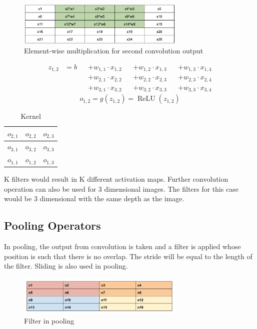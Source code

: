 \documentclass[11pt, twosides]{article}
\begin{document}
\begin{figure}[htp]
    \centering
    \includegraphics[width=8cm]{second.png}
    \caption{Element-wise multiplication for second convolution output}
    \label{fig:galaxy}
\end{figure}
\begin{align*}
    z_{1,2} &= b &&+ w_{1,1} \cdot x_{1,2} && + w_{1,2} \cdot x_{1,3} && + w_{1,3} \cdot x_{1,4} \\
            &    &&+ w_{2,1} \cdot x_{2,2} && + w_{2,2} \cdot x_{2,3} && + w_{2,3} \cdot x_{2,4} \\
            &    &&+ w_{3,1} \cdot x_{3,2} && + w_{3,2} \cdot x_{3,3} && + w_{3,3} \cdot x_{3,4}
\end{align*}
\begin{equation*}
    o_{1,2} = g(z_{1,2}) = \operatorname{ReLU}(z_{1,2})
\end{equation*}

\begin{table}[H]
  \centering
  \begin{tabular}
    { | c | c | c | } 
    \hline $o_{2,1}$ & $o_{2,2}$ & $o_{2,3}$ \\
    \hline $o_{3,1}$ & $o_{3,2}$ & $o_{3,3}$ \\
    \hline $o_{1,1}$ & $o_{1,2}$ & $o_{1,3}$ \\
    \hline
  \end{tabular}
  \caption{Kernel}
  \label{fig:my_label}
\end{table}

K filters would result in K different activation maps. Further convolution operation can also be used for 3 dimensional images. The filters for this case would be 3 dimensional with the same depth as the image. 
\subsection{Pooling Operators}

In pooling, the output from convolution is taken and a filter is applied whose position is such that there is no overlap. The stride will be equal to the length of the filter. Sliding is also used in pooling.

\begin{figure}[H]
    \centering
    \includegraphics[width=8cm]{filter.png}
    \caption{Filter in pooling}
    \label{fig:galaxy}
\end{figure}
\end{document}
